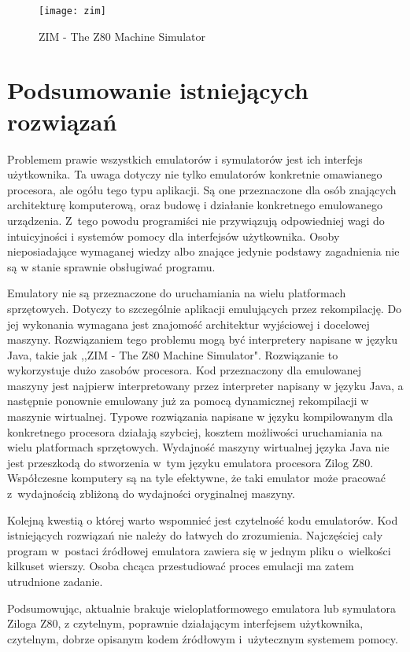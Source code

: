 	\begin{figure}[h]		
		\centering
		\texttt{[image: zim]}
		\caption{ZIM - The Z80 Machine Simulator}
		\label{img:zim}
	\end{figure}
	
	
	\section{Podsumowanie istniejących rozwiązań}
	Problemem prawie wszystkich emulatorów i symulatorów jest ich interfejs użytkownika. Ta uwaga dotyczy nie tylko emulatorów konkretnie omawianego procesora, ale ogółu tego typu aplikacji. Są one przeznaczone dla osób znających architekturę komputerową, oraz budowę i działanie konkretnego emulowanego urządzenia. Z~tego powodu programiści nie przywiązują odpowiedniej wagi do intuicyjności i systemów pomocy dla interfejsów użytkownika. Osoby nieposiadające wymaganej wiedzy albo znające jedynie podstawy zagadnienia nie są w stanie sprawnie obsługiwać programu. 
	
	Emulatory nie są przeznaczone do uruchamiania na wielu platformach sprzętowych. Dotyczy to szczególnie aplikacji emulujących przez rekompilację. Do jej wykonania wymagana jest znajomość architektur wyjściowej i docelowej maszyny. Rozwiązaniem tego problemu mogą być interpretery napisane w języku Java, takie jak ,,ZIM - The Z80 Machine Simulator". Rozwiązanie to wykorzystuje dużo zasobów procesora. Kod przeznaczony dla emulowanej maszyny jest najpierw interpretowany przez interpreter napisany w języku Java, a następnie ponownie emulowany już za pomocą dynamicznej rekompilacji w maszynie wirtualnej. Typowe rozwiązania napisane w języku kompilowanym dla konkretnego procesora działają szybciej, kosztem możliwości uruchamiania na wielu platformach sprzętowych. Wydajność maszyny wirtualnej języka Java nie jest przeszkodą do stworzenia w~tym języku emulatora procesora Zilog Z80. Współczesne komputery są na tyle efektywne, że taki emulator może pracować z~wydajnością zbliżoną do wydajności oryginalnej maszyny.
	
	Kolejną kwestią o której warto wspomnieć jest czytelność kodu emulatorów. Kod istniejących rozwiązań nie należy do łatwych do zrozumienia. Najczęściej cały program w~postaci źródłowej emulatora zawiera się w jednym pliku o~wielkości kilkuset wierszy. Osoba chcąca przestudiować proces emulacji ma zatem utrudnione zadanie.
	
	Podsumowując, aktualnie brakuje wieloplatformowego emulatora lub symulatora Ziloga Z80, z czytelnym, poprawnie działającym interfejsem użytkownika, czytelnym, dobrze opisanym kodem źródłowym i~użytecznym systemem pomocy.
	